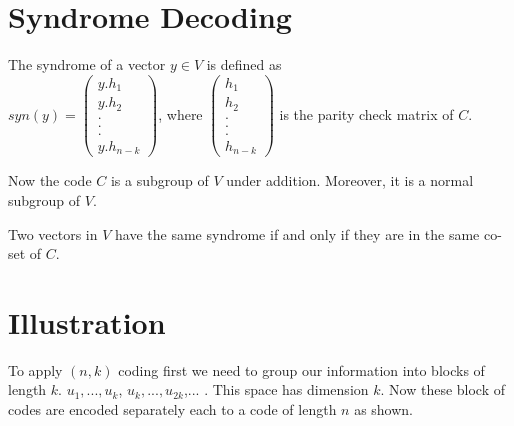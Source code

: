 \section{Syndrome Decoding}
\begin{definition}
    The syndrome of a vector \(y \in V\) is defined as \\ \(syn(y)=\begin{pmatrix}
        y.h_1\\
        y.h_2\\
        .\\
        .\\
        .\\
        y.h_{n-k}
    \end{pmatrix}\), \hspace{12mm} where \(\begin{pmatrix}
        h_1 \\ h_2\\ .\\ .\\ .\\ h_{n-k}
    \end{pmatrix}\) is the parity check matrix of \(C\).
\end{definition}
\vspace{3mm}
Now the code \(C\) is a subgroup of \(V\) under addition. Moreover, it is a normal subgroup of \(V\).
\begin{theorem}
    Two vectors in \(V\) have the same syndrome if and only if they are in the same co-set of \(C\).
\end{theorem}

\section{Illustration}
To apply \((n,k)\) coding first we need to group our information into blocks of length \(k\).
\(u_1,...,u_k\),  \(u_k,...,u_{2k}\),... . This space has dimension \(k\). Now these block of codes are encoded separately each to a code of length \(n\) as shown.


